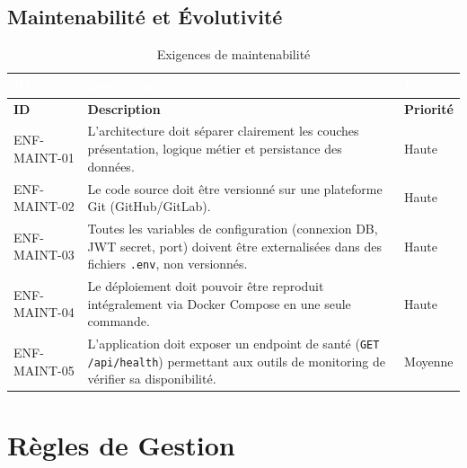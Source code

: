 \documentclass[12pt,a4paper]{report}
\begin{document}
\section{Maintenabilité et Évolutivité}

\begin{longtable}{|C{1.8cm}|L{9cm}|C{2cm}|}
\caption{Exigences de maintenabilité} \\
\hline
{}\textcolor{white}{\textbf{ID}} & \textcolor{white}{\textbf{Description}} & \textcolor{white}{\textbf{Priorité}} \\
\hline
\endfirsthead
\hline
\textbf{ID} & \textbf{Description} & \textbf{Priorité} \\
\hline
\endhead
ENF-MAINT-01 & L'architecture doit séparer clairement les couches présentation, logique métier et persistance des données. & Haute \\
\hline
ENF-MAINT-02 & Le code source doit être versionné sur une plateforme Git (GitHub/GitLab). & Haute \\
\hline
ENF-MAINT-03 & Toutes les variables de configuration (connexion DB, JWT secret, port) doivent être externalisées dans des fichiers \texttt{.env}, non versionnés. & Haute \\
\hline
ENF-MAINT-04 & Le déploiement doit pouvoir être reproduit intégralement via Docker Compose en une seule commande. & Haute \\
\hline
ENF-MAINT-05 & L'application doit exposer un endpoint de santé (\texttt{GET /api/health}) permettant aux outils de monitoring de vérifier sa disponibilité. & Moyenne \\
\hline
\end{longtable}

\chapter{Règles de Gestion}
\end{document}
